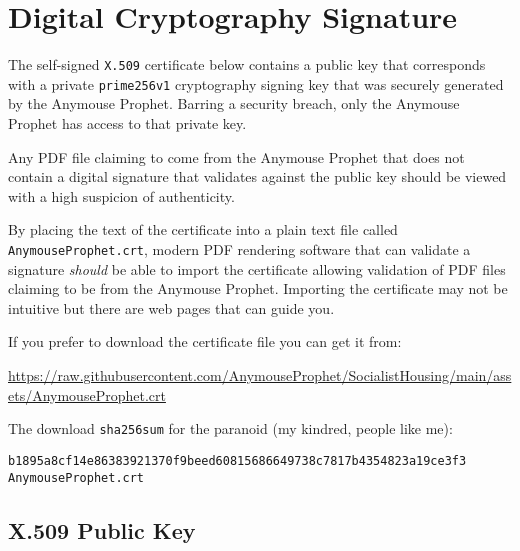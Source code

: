 \cleardoublepage %
\section*{Digital Cryptography Signature}


The self-signed \texttt{X.509} certificate below contains a public key that corresponds with a private \texttt{prime256v1} cryptography signing key that was securely generated by the Anymouse Prophet. Barring a security breach, only the Anymouse Prophet has access to that private key.

Any PDF file claiming to come from the Anymouse Prophet that does not contain a digital signature that validates against the public key should be viewed with a high suspicion of authenticity.

By placing the text of the certificate into a plain text file called \texttt{AnymouseProphet.crt}, modern PDF rendering software that can validate a signature \emph{should} be able to import the certificate allowing validation of PDF files claiming to be from the Anymouse Prophet. Importing the certificate may not be intuitive but there are web pages that can guide you.

If you prefer to download the certificate file you can get it from:

\bigskip

\url{https://raw.githubusercontent.com/AnymouseProphet/SocialistHousing/main/assets/AnymouseProphet.crt}

\bigskip

The download \texttt{sha256sum} for the paranoid (my kindred, people like me):

\makeatletter
\newcommand{\verbatimfont}[1]{\renewcommand{\verbatim@font}{\ttfamily#1}}
\makeatother

\verbatimfont{\footnotesize}%
\begin{verbatim}
b1895a8cf14e86383921370f9beed60815686649738c7817b4354823a19ce3f3  AnymouseProphet.crt
\end{verbatim}

\subsection*{X.509 Public Key}

\bigskip


